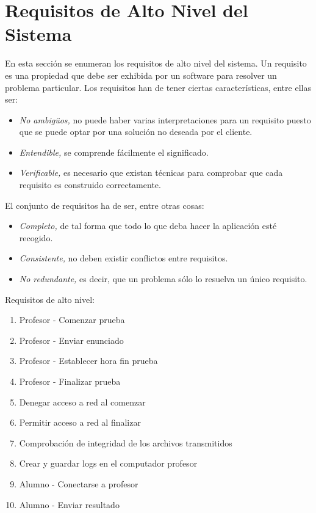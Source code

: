 \section{Requisitos de Alto Nivel del Sistema}
\label{sec:planificacion:requisitos}

En esta sección se enumeran los requisitos de alto nivel del sistema.
Un requisito es una propiedad que debe ser exhibida por un software para resolver un problema particular.
Los requisitos han de tener ciertas características, entre ellas ser:
\begin{itemize}

\item \emph{No ambigüos,} no puede haber varias interpretaciones para un requisito puesto que se puede optar por una solución no deseada por el cliente.

\item \emph{Entendible,} se comprende fácilmente el significado.

\item \emph{Verificable,} es necesario que existan técnicas para comprobar que cada requisito es construido correctamente.

\end{itemize}

	
El conjunto de requisitos ha de ser, entre otras cosas:

\begin{itemize}

\item \emph{Completo,} de tal forma que todo lo que deba hacer la aplicación esté recogido.
\item \emph{Consistente,} no deben existir conflictos entre requisitos.
\item \emph{No redundante,} es decir, que un problema sólo lo resuelva un único requisito.
	
\end{itemize}


Requisitos de alto nivel:

\begin{enumerate}

\item Profesor - Comenzar prueba
\item Profesor - Enviar enunciado
\item Profesor - Establecer hora fin prueba
\item Profesor - Finalizar prueba
\item Denegar acceso a red al comenzar
\item Permitir acceso a red al finalizar
\item Comprobación de integridad de los archivos transmitidos
\item Crear y guardar logs en el computador profesor
\item Alumno - Conectarse a profesor
\item Alumno - Enviar resultado

\end{enumerate}
